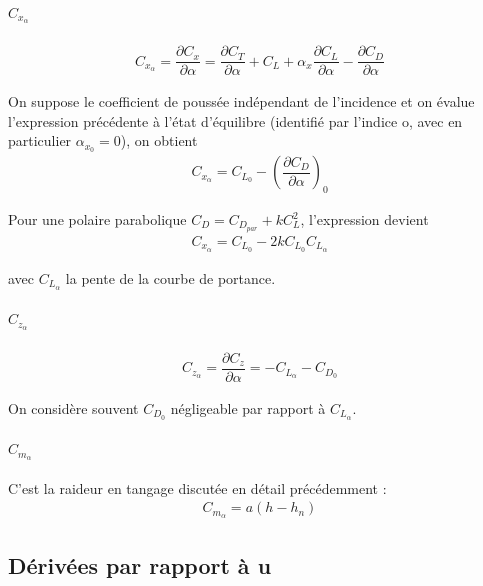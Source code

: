 \documentclass{report}
\begin{document}
\paragraph{$C_{x_\alpha}$}

\begin{eqnarray}
C_{x_\alpha}=\dfrac{\partial C_x}{\partial\alpha} = \dfrac{\partial C_T}{\partial\alpha}+C_L+\alpha_x\dfrac{\partial C_L}{\partial \alpha}-\dfrac{\partial C_D}{\partial \alpha}
\end{eqnarray}

On suppose le coefficient de poussée indépendant de l'incidence et on évalue l'expression précédente à l'état d'équilibre (identifié par l'indice o, avec en particulier $\alpha_{x_0}=0$), on obtient
\begin{eqnarray}
C_{x_\alpha}=C_{L_0}-\left(\dfrac{\partial C_D}{\partial\alpha}\right)_0
\end{eqnarray}

Pour une polaire parabolique $C_D=C_{D_{par}}+kC_L^2$, l'expression devient
\begin{eqnarray}
C_{x_\alpha}=C_{L_0}-2kC_{L_0}C_{L_\alpha}
\end{eqnarray}

avec $C_{L_\alpha}$ la pente de la courbe de portance.

\paragraph{$C_{z_\alpha}$}

\begin{eqnarray}
C_{z_\alpha} = \dfrac{\partial C_z}{\partial \alpha}=-C_{L_\alpha}-C_{D_0}
\end{eqnarray}

On considère souvent $C_{D_0}$ négligeable par rapport à $C_{L_\alpha}$.

\paragraph{$C_{m_\alpha}$}

C'est la raideur en tangage discutée en détail précédemment :
\begin{eqnarray}
C_{m_\alpha}=a(h-h_n)
\end{eqnarray}

\subsection{Dérivées par rapport à u}
\end{document}
